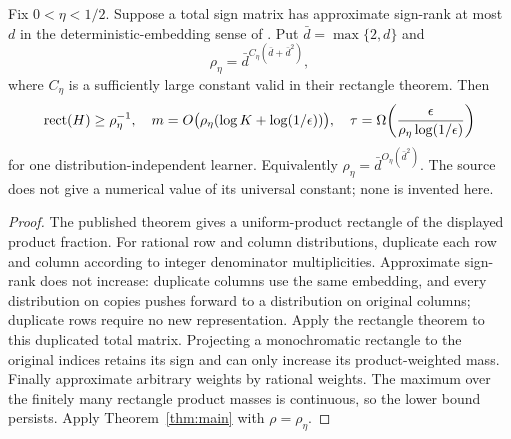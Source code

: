\begin{samepage}
\begin{corollary}\label{cor:approxrect}
Fix $0<\eta<1/2$. Suppose a total sign matrix has approximate sign-rank at most $d$ in the deterministic-embedding sense of \citet{BHKR26}. Put $\bar d=\max\{2,d\}$ and
\[
 \rho_\eta=\bar d^{C_\eta(\bar d+\bar d^2)},
\]
where $C_\eta$ is a sufficiently large constant valid in their rectangle theorem. Then
\[
 \operatorname{rect}(H)\ge\rho_\eta^{-1},\quad
 m=O\bigl(\rho_\eta(\log K+\log(1/\epsilon))\bigr),\quad
 \tau=\Omega\!\left(\frac{\epsilon}{\rho_\eta\log(1/\epsilon)}\right)
\]
for one distribution-independent learner. Equivalently $\rho_\eta=\bar d^{O_\eta(\bar d^2)}$. The source does not give a numerical value of its universal constant; none is invented here.
\end{corollary}
\end{samepage}
\begin{proof}
The published theorem gives a uniform-product rectangle of the displayed product fraction. For rational row and column distributions, duplicate each row and column according to integer denominator multiplicities. Approximate sign-rank does not increase: duplicate columns use the same embedding, and every distribution on copies pushes forward to a distribution on original columns; duplicate rows require no new representation. Apply the rectangle theorem to this duplicated total matrix. Projecting a monochromatic rectangle to the original indices retains its sign and can only increase its product-weighted mass. Finally approximate arbitrary weights by rational weights. The maximum over the finitely many rectangle product masses is continuous, so the lower bound persists. Apply Theorem~\ref{thm:main} with $\rho=\rho_\eta$.
\end{proof}
